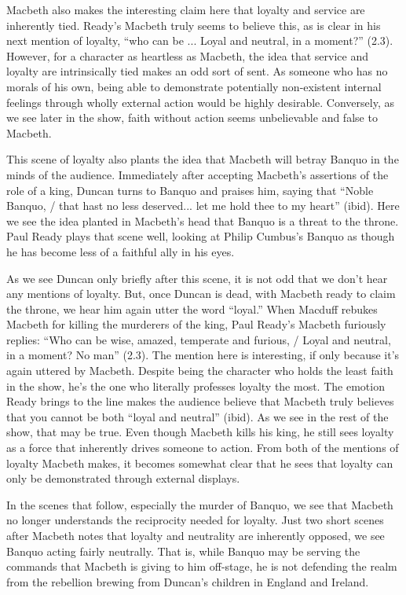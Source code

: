 \documentclass[12pt]{article}[titlepage]
\newcommand{\say}[1]{``#1''}
\newcommand{\1}{\={a}}
\newcommand{\2}{\={e}}
\newcommand{\3}{\={\i}}
\newcommand{\4}{\=o}
\newcommand{\5}{\=u}
\newcommand{\6}{\={A}}
\renewcommand{\,}{\textsuperscript{,}}
\begin{document}
Macbeth also makes the interesting claim here that loyalty and service are inherently tied.
Ready's Macbeth truly seems to believe this, as is clear in his next mention of loyalty, \say{who can be ... Loyal and neutral, in a moment?} (2.3).
However, for a character as heartless as Macbeth, the idea that service and loyalty are intrinsically tied makes an odd sort of sent.
As someone who has no morals of his own, being able to demonstrate potentially non-existent internal feelings through wholly external action would be highly desirable.
Conversely, as we see later in the show, faith without action seems unbelievable and false to Macbeth.

This scene of loyalty also plants the idea that Macbeth will betray Banquo in the minds of the audience.
Immediately after accepting Macbeth's assertions of the role of a king, Duncan turns to Banquo and praises him, saying that \say{Noble Banquo, / that hast no less deserved... let me hold thee to my heart} (ibid).
Here we see the idea planted in Macbeth's head that Banquo is a threat to the throne.
Paul Ready plays that scene well, looking at Philip Cumbus's Banquo as though he has become less of a faithful ally in his eyes.

As we see Duncan only briefly after this scene, it is not odd that we don't hear any mentions of loyalty.
But, once Duncan is dead, with Macbeth ready to claim the throne, we hear him again utter the word \say{loyal.}
When Macduff rebukes Macbeth for killing the murderers of the king, Paul Ready's Macbeth furiously replies: \say{Who can be wise, amazed, temperate and furious, / Loyal and neutral, in a moment? No man} (2.3).
The mention here is interesting, if only because it's again uttered by Macbeth.
Despite being the character who holds the least faith in the show, he's the one who literally professes loyalty the most.
The emotion Ready brings to the line makes the audience believe that Macbeth truly believes that you cannot be both \say{loyal and neutral} (ibid).
As we see in the rest of the show, that may be true.
Even though Macbeth kills his king, he still sees loyalty as a force that inherently drives someone to action.
From both of the mentions of loyalty Macbeth makes, it becomes somewhat clear that he sees that loyalty can only be demonstrated through external displays.

In the scenes that follow, especially the murder of Banquo, we see that Macbeth no longer understands the reciprocity needed for loyalty.
Just two short scenes after Macbeth notes that loyalty and neutrality are inherently opposed, we see Banquo acting fairly neutrally.
That is, while Banquo may be serving the commands that Macbeth is giving to him off-stage, he is not defending the realm from the rebellion brewing from Duncan's children in England and Ireland.
\end{document}
